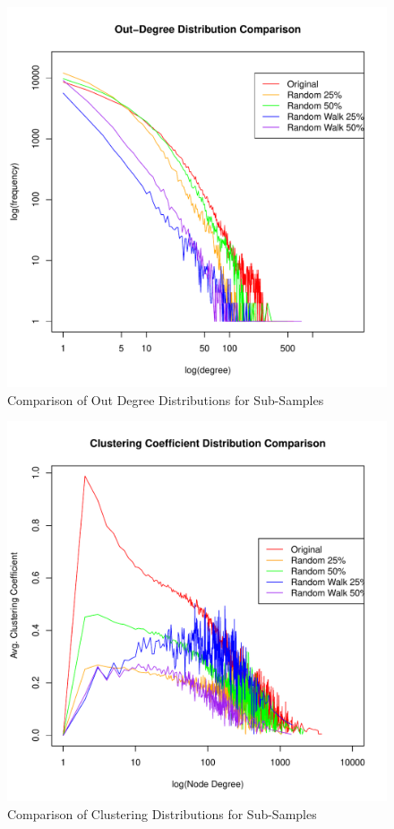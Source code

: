 \documentclass[pdftex,11pt,a4paper,twocolumn]{scrartcl}
\begin{document}
\pagebreak

\begin{figure}[h!]
\centering
\includegraphics[width=\columnwidth]{subsampleComparison_outDeg.pdf} 
\caption{Comparison of Out Degree Distributions for Sub-Samples \label{fig:ssOutDeg}}
\end{figure}



\begin{figure}[h!]
\centering
\includegraphics[width=\columnwidth]{subsampleComparison_clustering.pdf} 
\caption{Comparison of Clustering Distributions for Sub-Samples \label{fig:ssCluster}}
\end{figure}
\end{document}
